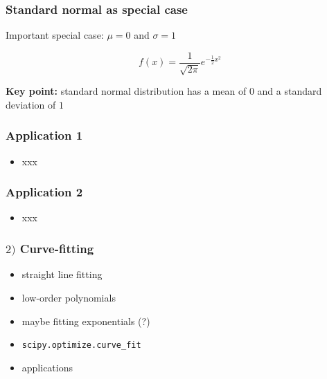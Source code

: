 \documentclass[english,14pt]{beamer}
\begin{document}

\begin{frame}[fragile]

\frametitle{Standard normal as special case}

Important special case: $\mu=0$ and $\sigma=1$

\[
f(x) = \frac{1}{\sqrt{2\pi}} e^{-\frac{1}{2}x^2}
\]

\textbf{Key point:} standard normal distribution has a mean of $0$ and a standard deviation of $1$

\end{frame}


\begin{frame}[fragile]

\frametitle{Application 1}

\begin{itemize}
	\item xxx
\end{itemize}

\end{frame}


\begin{frame}[fragile]

\frametitle{Application 2}

\begin{itemize}
	\item xxx
\end{itemize}

\end{frame}


\begin{frame}[fragile]

\frametitle{$2)$ Curve-fitting}

\begin{itemize}
	\item straight line fitting
	\item low-order polynomials
	\item maybe fitting exponentials (?)
	\item \texttt{scipy.optimize.curve\_fit}
	\item applications
\end{itemize}

\end{frame}
\end{document}
